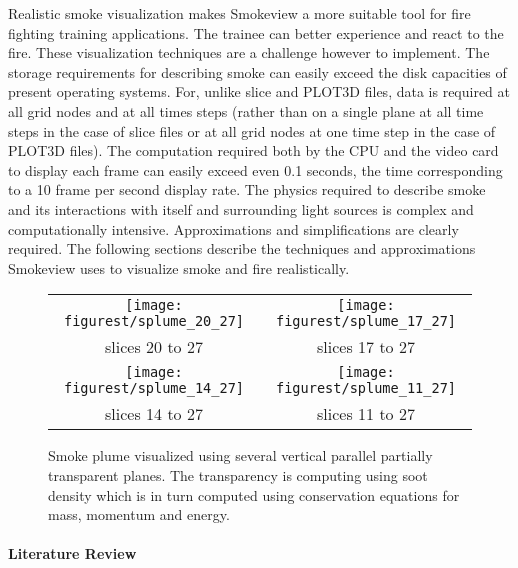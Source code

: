 Realistic smoke visualization makes Smokeview a more suitable tool
for fire fighting training applications.  The trainee can better
experience and react to the fire. These visualization techniques
are a challenge however to implement. The storage requirements for
describing smoke can easily exceed the disk capacities of present
operating systems. For, unlike slice and PLOT3D files, data is
required at all grid nodes and at all times steps (rather than on
a single plane at all time steps in the case of slice files or at
all grid nodes at one time step in the case of PLOT3D files). The
computation required both by the CPU and the video card to display
each frame can easily exceed even 0.1 seconds, the time
corresponding to a 10 frame per second display rate.  The physics
required to describe smoke and its interactions with itself and
surrounding light sources is complex and computationally
intensive. Approximations and simplifications are clearly
required.  The following sections describe the techniques and
approximations Smokeview uses to visualize smoke and fire
realistically.


\begin{figure}[t]
\begin{center}
\begin{tabular}{cc}
\texttt{[image: figurest/splume\_20\_27]}&\texttt{[image: figurest/splume\_17\_27]}\\
slices 20 to 27&slices 17 to 27\\
\texttt{[image: figurest/splume\_14\_27]}&\texttt{[image: figurest/splume\_11\_27]}\\
slices 14 to 27&slices 11 to 27
\end{tabular}
\end{center}
\caption [Smoke plume visualized using several vertical parallel
partially transparent planes.] {Smoke plume visualized using
several vertical parallel partially transparent planes. The
transparency is computing using soot density which is in turn
computed using conservation equations for mass, momentum and
energy. } \label{figplume}
\end{figure}

\paragraph{Literature Review}

\cite{stam:99}\cite{stam:95}\cite{fedkiw:01}\cite{stam:00}
\cite{PRESS88a} \cite{marchingcubes}

